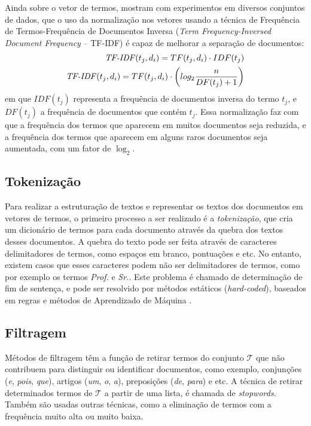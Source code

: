 \documentclass[
    12pt,                %
    oneside,            %
    a4paper,            %
    english,            %
    brazil                %
    ]{abntex2ppgsi}
\begin{document}
Ainda sobre o vetor de termos,  mostram com experimentos em diversos conjuntos de dados, que o uso da normalização nos vetores usando a técnica de Frequência de Termos-Frequência de Documentos Inversa (\textit{Term Frequency-Inversed Document Frequency} -- TF-IDF) é capaz de melhorar a separação de documentos:
\begin{equation}
\begin{split}
    \text{\textit{TF-IDF}}(t_j, d_i) = TF(t_j, d_i) \cdot IDF(t_j) \\
    \text{\textit{TF-IDF}}(t_j, d_i) = TF(t_j, d_i) \cdot \left( log_{2} \frac{n}{DF(t_j) + 1} \right)
\end{split}
\end{equation}
em que $IDF(t_j)$ representa a frequência de documentos inversa do termo $t_j$, e $DF(t_j)$ a frequência de documentos que contém $t_j$. Essa normalização faz com que a frequência dos termos que aparecem em muitos documentos seja reduzida, e a frequência dos termos que aparecem em alguns raros documentos seja aumentada, com um fator de $\log_{2}$.


\subsection{Tokenização}

Para realizar a estruturação de textos e representar os textos dos documentos em vetores de termos, o primeiro processo a ser realizado é a \textit{tokenização}, que cria um dicionário de termos para cada documento através da quebra dos textos desses documentos.
A quebra do texto pode ser feita através de caracteres delimitadores de termos, como espaços em branco, pontuações e etc. No entanto, existem casos que esses caracteres podem não ser delimitadores de termos, como por exemplo os termos \textit{Prof.} e \textit{Sr.}.
Este problema é chamado de determinação de fim de sentença, e pode ser resolvido por métodos estáticos (\textit{hard-coded}), baseados em regras e métodos de Aprendizado de Máquina \cite{Weiss2010}.

\subsection{Filtragem}

Métodos de filtragem têm a função de retirar termos do conjunto $\mathcal{T}$ que não contribuem para distinguir ou identificar documentos, como exemplo, conjunções (\textit{e}, \textit{pois}, \textit{que}), artigos (\textit{um}, \textit{o}, \textit{a}), preposições (\textit{de}, \textit{para}) e etc.
A técnica de retirar determinados termos de $\mathcal{T}$ a partir de uma lista, é chamada de \textit{stopwords}.
Também são usadas outras técnicas, como a eliminação de termos com a frequência muito alta ou muito baixa.
\end{document}
